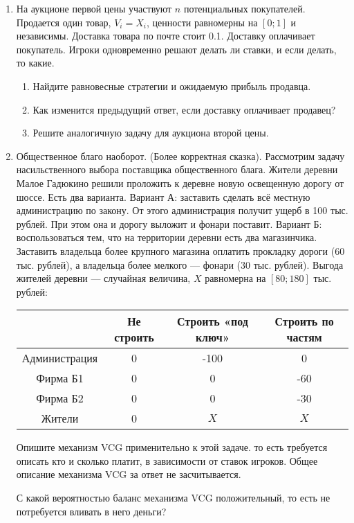 \begin{enumerate}
\item На аукционе первой цены участвуют $ n $ потенциальных покупателей. Продается один товар, $ V_{i}=X_{i} $, ценности равномерны на $ [0;1] $ и независимы. Доставка товара по почте стоит 0.1. Доставку оплачивает покупатель. Игроки одновременно решают делать ли ставки, и если делать, то какие.

\begin{enumerate}
\item Найдите равновесные стратегии и ожидаемую прибыль продавца.
\item Как изменится предыдущий ответ, если доставку оплачивает продавец?
\item Решите аналогичную задачу для аукциона второй цены.
\end{enumerate}


\item Общественное благо наоборот. (Более корректная сказка). Рассмотрим задачу насильственного выбора поставщика общественного блага. Жители деревни Малое Гадюкино решили проложить к деревне новую освещенную дорогу от шоссе. Есть два варианта. Вариант А: заставить сделать всё местную администрацию по закону. От этого администрация получит ущерб в 100 тыс. рублей. При этом она и дорогу выложит и фонари поставит. Вариант Б: воспользоваться тем, что на территории деревни есть два магазинчика. Заставить владельца более крупного магазина оплатить прокладку дороги (60 тыс. рублей), а владельца более мелкого — фонари (30 тыс. рублей). Выгода жителей деревни — случайная величина, $ X $ равномерна на $ [80;180] $ тыс. рублей:

\begin{tabular}{c|ccc}
& Не строить & Строить «под ключ» & Строить по частям \\
\hline
Администрация & 0 & -100 & 0\\
Фирма Б1 & 0 & 0 & -60\\
Фирма Б2 & 0 & 0 & -30\\
Жители & 0 & $X$ & $X$\\
\end{tabular}

Опишите механизм VCG применительно к этой задаче. то есть требуется описать кто и сколько платит, в зависимости от ставок игроков. Общее описание механизма VCG за ответ не засчитывается.

С какой вероятностью баланс механизма VCG положительный, то есть не потребуется вливать в него деньги?



\end{enumerate}
